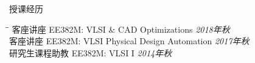 \begin{rSection}{授课经历}

\begin{tabbing}
\hspace{3.3in}\= \hspace{3.1in}\= \kill
客座讲座 \> EE382M: VLSI \& CAD Optimizations \> {\em 2018年秋 } \\
客座讲座 \> EE382M: VLSI Physical Design Automation \> {\em 2017年秋 } \\
研究生课程助教 \> EE382M: VLSI I \> {\em 2014年秋 }
\end{tabbing}

\end{rSection}
